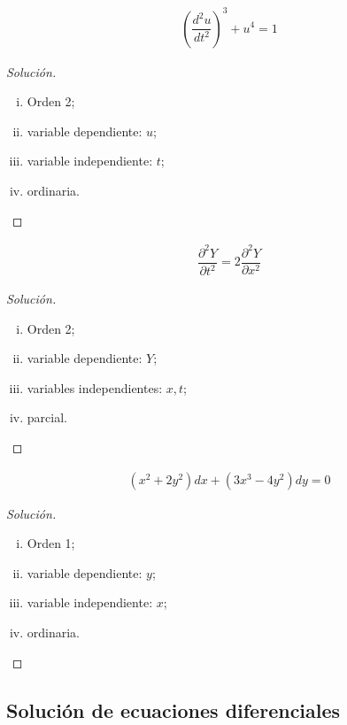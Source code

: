 
\begin{align*}
	\left(\dfrac{d^{2}u}{dt^{2}}\right)^{3}+u^{4}=1
\end{align*}
\begin{proof}[Solución]
	\begin{enumerate}[(i)]
		\item Orden 2;
		\item variable dependiente: $ u $;
		\item variable independiente: $ t $;
		\item ordinaria.
	\end{enumerate}
\end{proof}



\begin{align*}
	\dfrac{\partial^{2}Y}{\partial t^{2}} = 2\dfrac{\partial^{2}Y}{\partial x^{2}}
\end{align*}
\begin{proof}[Solución]
	\begin{enumerate}[(i)]
		\item Orden 2;
		\item variable dependiente: $ Y $;
		\item variables independientes: $ x,t $;
		\item parcial.
	\end{enumerate}
\end{proof}



\begin{align*}
	\left(x^{2}+2y^{2}\right)dx +\left(3x^{3}-4y^{2}\right)dy=0
\end{align*}
\begin{proof}[Solución]
	\begin{enumerate}[(i)]
		\item Orden 1;
		\item variable dependiente: $ y  $;
		\item variable independiente: $ x $;
		\item ordinaria.
	\end{enumerate}
\end{proof}


\subsection{Solución de ecuaciones diferenciales}

